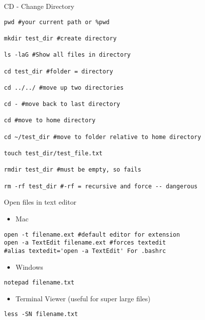 \documentclass[presentation]{beamer}
\begin{document}
\begin{frame}[fragile,label=sec-3-0-5]{CD - Change Directory}
 \lstset{numbers=left,language=sh,label= ,caption= }
\begin{lstlisting}
pwd #your current path or %pwd 

mkdir test_dir #create directory

ls -laG #Show all files in directory

cd test_dir #folder = directory

cd ../../ #move up two directories

cd - #move back to last directory

cd #move to home directory

cd ~/test_dir #move to folder relative to home directory

touch test_dir/test_file.txt

rmdir test_dir #must be empty, so fails

rm -rf test_dir #-rf = recursive and force -- dangerous
\end{lstlisting}
\end{frame}


\begin{frame}[fragile,label=sec-3-0-6]{Open files in text editor}
 \begin{itemize}
\item Mac
\end{itemize}
\lstset{numbers=left,language=sh,label= ,caption= }
\begin{lstlisting}
open -t filename.ext #default editor for extension
open -a TextEdit filename.ext #forces textedit
#alias textedit='open -a TextEdit' For .bashrc
\end{lstlisting}
\begin{itemize}
\item Windows
\end{itemize}
\lstset{numbers=left,language=sh,label= ,caption= }
\begin{lstlisting}
notepad filename.txt
\end{lstlisting}
\begin{itemize}
\item Terminal Viewer (useful for super large files)
\end{itemize}
\lstset{numbers=left,language=sh,label= ,caption= }
\begin{lstlisting}
less -SN filename.txt
\end{lstlisting}
\end{frame}
\end{document}
